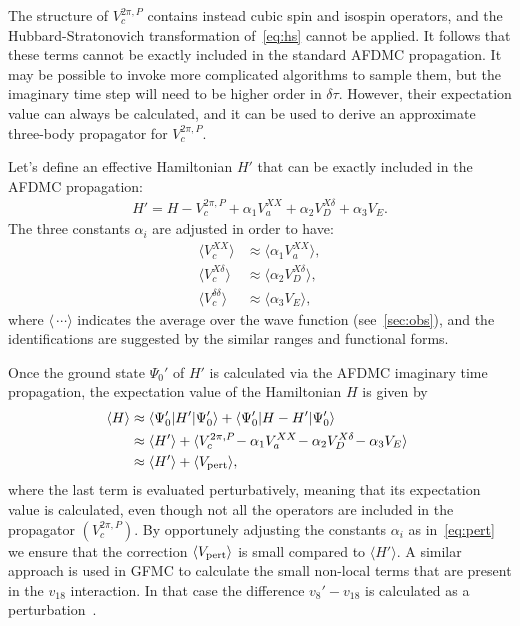 \documentclass[aps,prc,twocolumn,superscriptaddress,floatfix]{revtex4-1}
\begin{document}
The structure of $V_c^{2\pi,P}$ contains instead cubic spin and isospin operators, 
and the Hubbard-Stratonovich transformation of~\cref{eq:hs} cannot be applied.
It follows that these terms cannot be exactly included in the standard AFDMC propagation.
It may be possible to invoke more complicated algorithms to sample them, 
but the imaginary time step will need to be higher order in $\delta\tau$.
However, their expectation value can always be calculated, and it can be used to derive
an approximate three-body propagator for $V_c^{2\pi,P}$.

Let's define an effective Hamiltonian $H'$ that can be exactly included in 
the AFDMC propagation:
\begin{align}
H'=H-V_c^{2\pi,P}+\alpha_1 V_a^{XX}+\alpha_2 V_D^{X\delta}+\alpha_3 V_E .
\label{eq:h'}
\end{align}
The three constants $\alpha_i$ are adjusted in order to have:
\begin{align}
\langle V_c^{XX}\rangle & \approx\langle\alpha_1 V_a^{XX}\rangle , \nonumber \\
\langle V_c^{X\delta}\rangle & \approx\langle\alpha_2 V_D^{X\delta}\rangle , \nonumber  \\
\langle V_c^{\delta\delta}\rangle & \approx\langle\alpha_3 V_E\rangle , 
\label{eq:pert}
\end{align}
where $\langle\,\cdots\rangle$ indicates the average over the wave function
(see~\cref{sec:obs}), and the identifications are suggested by the similar 
ranges and functional forms.

Once the ground state $\Psi_0'$ of $H'$ is calculated via the AFDMC imaginary
time propagation, the expectation value of the Hamiltonian $H$ is given by
\begin{align}
\!\!\langle H\rangle &\approx\langle\Psi_0'|H'|\Psi_0'\rangle+\langle\Psi_0'|H-H'|\Psi_0'\rangle \nonumber \\
& \approx\langle H'\rangle+\langle V_c^{2\pi,P}\!-\alpha_1V_a^{XX}\!-\alpha_2V_D^{X\delta}\!-\alpha_3V_E\rangle \nonumber \\
& \approx\langle H'\rangle+\langle V_{\rm pert}\rangle ,
\label{eq:<h3b>}
\end{align}
where the last term is evaluated perturbatively, meaning that its expectation
value is calculated, even though not all the operators are included in the propagator $(V_c^{2\pi,P})$.
By opportunely adjusting the constants $\alpha_i$ as in~\cref{eq:pert} we ensure that
the correction $\langle V_{\rm pert}\rangle$ is small compared to $\langle H'\rangle$.
A similar approach is used in GFMC to calculate the small non-local terms that are 
present in the $v_{18}$ interaction. In that case the difference $v_8'-v_{18}$
is calculated as a perturbation~\cite{Pudliner:1997}.
\end{document}
